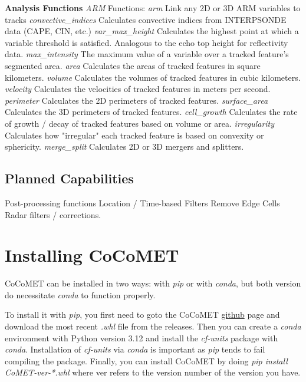 \documentclass[10pt,a4paper]{article}
\begin{document}
\begin{outline}
			\1 \textbf{Analysis Functions}
				\2 \emph{ARM} Functions:
					\3 \emph{arm} Link any 2D or 3D ARM variables to tracks
					\3 \emph{convective\_indices} Calculates convective indices from INTERPSONDE data (CAPE, CIN, etc.)
				\2 \emph{var\_max\_height} Calculates the highest point at which a variable threshold is satisfied. Analogous to the echo top height for reflectivity data.
				\2 \emph{max\_intensity} The maximum value of a variable over a tracked feature's segmented area.
				\2 \emph{area} Calculates the areas of tracked features in square kilometers. 
				\2 \emph{volume} Calculates the volumes of tracked features in cubic kilometers. 
				\2 \emph{velocity} Calculates the velocities of tracked features in meters per second.
				\2 \emph{perimeter} Calculates the 2D perimeters of tracked features.
				\2 \emph{surface\_area} Calculates the 3D perimeters of tracked features.
				\2 \emph{cell\_growth} Calculates the rate of growth / decay of tracked features based on volume or area.
				\2 \emph{irregularity} Calculates how "irregular" each tracked feature is based on convexity or sphericity. 
				\2 \emph{merge\_split} Calculates 2D or 3D mergers and splitters. 
		\end{outline}
		
		
		\subsection{Planned Capabilities}
		\begin{outline}
			\1 Post-processing functions
				\2 Location / Time-based Filters
				\2 Remove Edge Cells
			\1 Radar filters / corrections.
		\end{outline}
	
	\section{Installing CoCoMET}
	CoCoMET can be installed in two ways: with \emph{pip} or with \emph{conda}, but both version do necessitate \emph{conda} to function properly. 
	
	To install it with \emph{pip}, you first need to goto the CoCoMET \href{https://github.com/ASCENT-BNL/CoMET}{github} page and download the most recent \emph{.whl} file from the releases. Then you can create a \emph{conda} environment with Python version 3.12 and install the \emph{cf-units} package with \emph{conda}. Installation of \emph{cf-units} via \emph{conda} is important as \emph{pip} tends to fail compiling the package. Finally, you can install CoCoMET by doing \emph{pip install CoMET-ver-*.whl} where ver refers to the version number of the version you have.
	
\end{document}
